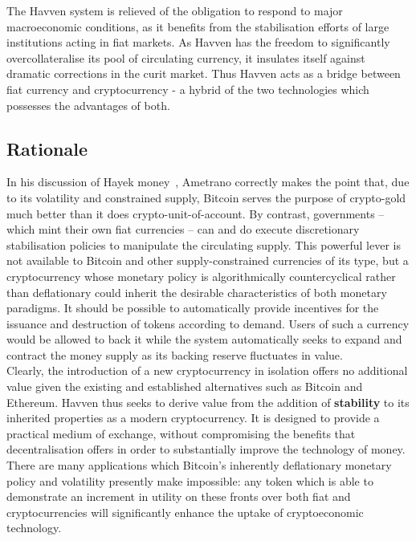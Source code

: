 \noindent The Havven system is relieved of the obligation to respond to major macroeconomic conditions, 
as it benefits from the stabilisation efforts of large institutions acting in fiat markets.
As Havven has the freedom to significantly overcollateralise its pool of circulating currency, it
insulates itself against dramatic corrections in the curit market.
Thus Havven acts as a bridge between fiat currency and cryptocurrency - a hybrid of the two technologies which possesses
the advantages of both. \\

\subsection{Rationale}

\noindent  In his discussion of Hayek money~\cite{ametrano2016hayek}, Ametrano correctly makes the point that,
due to its volatility and constrained supply, Bitcoin serves the purpose of crypto-gold much better than it
does crypto-unit-of-account. By contrast, governments -- which mint their own fiat currencies -- can and do execute
discretionary stabilisation policies to manipulate the circulating supply. This powerful lever is not
available to Bitcoin and other supply-constrained currencies of its type, but a cryptocurrency whose monetary
policy is algorithmically countercyclical rather than deflationary could inherit the desirable characteristics
of both monetary paradigms. It should be possible to automatically provide incentives for the issuance and
destruction of tokens according to demand. Users of such a currency would be allowed to back it while
the system automatically seeks to expand and contract the money supply as its backing
reserve fluctuates in value. \\

\noindent Clearly, the introduction of a new cryptocurrency in isolation offers no additional value given
the existing and established alternatives such as Bitcoin and Ethereum. Havven thus seeks to derive value
from the addition of \textbf{stability} to its inherited properties as a modern cryptocurrency.
It is designed to provide a practical medium of exchange, without compromising the benefits that
decentralisation offers in order to substantially improve the technology of money.
There are many applications which Bitcoin's inherently deflationary monetary policy and
volatility presently make impossible: any token which is able to demonstrate an increment
in utility on these fronts over both fiat and cryptocurrencies will significantly
enhance the uptake of cryptoeconomic technology.

\pagebreak
